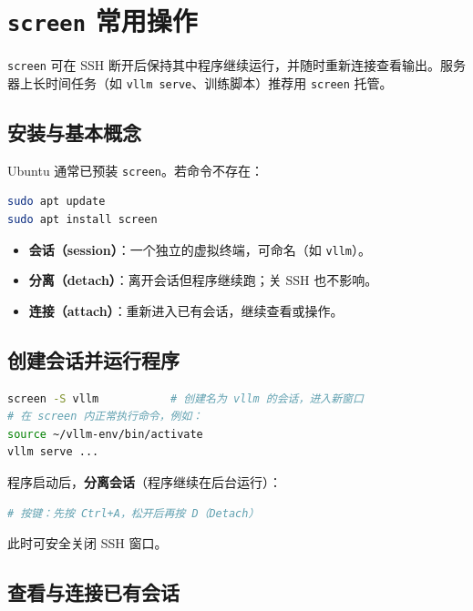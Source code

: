\section{\texttt{screen} 常用操作}

\texttt{screen} 可在 SSH 断开后保持其中程序继续运行，并随时重新连接查看输出。服务器上长时间任务（如 \texttt{vllm serve}、训练脚本）推荐用 \texttt{screen} 托管。

\subsection{安装与基本概念}

Ubuntu 通常已预装 \texttt{screen}。若命令不存在：

\begin{lstlisting}[language=sh]
sudo apt update
sudo apt install screen
\end{lstlisting}

\begin{itemize}
    \item \textbf{会话（session）}：一个独立的虚拟终端，可命名（如 \texttt{vllm}）。
    \item \textbf{分离（detach）}：离开会话但程序继续跑；关 SSH 也不影响。
    \item \textbf{连接（attach）}：重新进入已有会话，继续查看或操作。
\end{itemize}

\subsection{创建会话并运行程序}

\begin{lstlisting}[language=sh]
screen -S vllm           # 创建名为 vllm 的会话，进入新窗口
# 在 screen 内正常执行命令，例如：
source ~/vllm-env/bin/activate
vllm serve ...
\end{lstlisting}

程序启动后，\textbf{分离会话}（程序继续在后台运行）：

\begin{lstlisting}[language=sh]
# 按键：先按 Ctrl+A，松开后再按 D（Detach）
\end{lstlisting}

此时可安全关闭 SSH 窗口。

\subsection{查看与连接已有会话}

